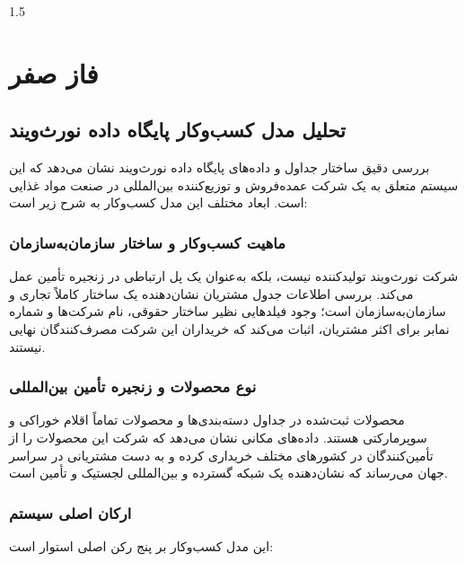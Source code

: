 \documentclass[14pt,a4paper]{extarticle}
\begin{document}

\begin{spacing}{1.5}
	\tableofcontents
\end{spacing}

\clearpage

\setcounter{page}{1}
	\section{فاز صفر}
	\subsection{تحلیل مدل کسب‌وکار پایگاه داده نورث‌ویند}
	
	بررسی دقیق ساختار جداول و داده‌های پایگاه داده نورث‌ویند نشان می‌دهد که این سیستم متعلق به یک شرکت عمده‌فروش و توزیع‌کننده بین‌المللی در صنعت مواد غذایی است. ابعاد مختلف این مدل کسب‌وکار به شرح زیر است:
	
	\subsubsection{ماهیت کسب‌وکار و ساختار سازمان‌به‌سازمان}
	شرکت نورث‌ویند تولیدکننده نیست، بلکه به‌عنوان یک پل ارتباطی در زنجیره تأمین عمل می‌کند. بررسی اطلاعات جدول مشتریان نشان‌دهنده یک ساختار کاملاً تجاری و سازمان‌به‌سازمان است؛ وجود فیلدهایی نظیر ساختار حقوقی، نام شرکت‌ها و شماره نمابر برای اکثر مشتریان، اثبات می‌کند که خریداران این شرکت مصرف‌کنندگان نهایی نیستند.
	
	\subsubsection{نوع محصولات و زنجیره تأمین بین‌المللی}
	محصولات ثبت‌شده در جداول دسته‌بندی‌ها و محصولات تماماً اقلام خوراکی و سوپرمارکتی هستند. داده‌های مکانی نشان می‌دهد که شرکت این محصولات را از تأمین‌کنندگان در کشورهای مختلف خریداری کرده و به دست مشتریانی در سراسر جهان می‌رساند که نشان‌دهنده یک شبکه گسترده و بین‌المللی لجستیک و تأمین است.
	
	\subsubsection{ارکان اصلی سیستم}
	این مدل کسب‌وکار بر پنج رکن اصلی استوار است:
	
\end{document}
